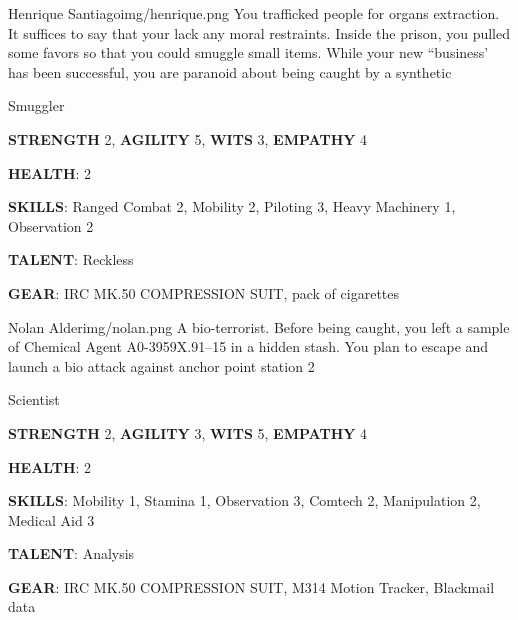 \newsect

\medskip \medskip \medskip \medskip \medskip  \medskip \medskip \medskip \medskip \medskip \medskip \medskip \medskip \medskip \medskip  \medskip \medskip \medskip \medskip \medskip 

\begin{rpg-pcbox}{Henrique Santiago}{img/henrique.png}
    You trafficked people for organs extraction. It suffices to say that your lack any moral restraints.
    Inside the prison, you pulled some favors so that you could smuggle small items. While your new ``business' has been successful, you are paranoid about being caught by a synthetic
\end{rpg-pcbox}

\begin{rpg-commentbox}{}
    Smuggler

    \textbf{STRENGTH} 2, \textbf{AGILITY} 5, \textbf{WITS} 3, \textbf{EMPATHY} 4

    \textbf{HEALTH}: 2

    \textbf{SKILLS}: Ranged Combat 2, Mobility 2, Piloting 3, Heavy Machinery 1, Observation 2
    
    \textbf{TALENT}: Reckless
    
    \textbf{GEAR}: IRC MK.50 COMPRESSION SUIT, pack of cigarettes
\end{rpg-commentbox}

\newsect

\begin{rpg-pcbox}{Nolan Alder}{img/nolan.png}
    A bio-terrorist. Before being caught, you left a sample of Chemical Agent A0-3959X.91–15 in a hidden stash. You plan to escape and launch a bio attack against anchor point station 2
\end{rpg-pcbox}

\begin{rpg-commentbox}{}
    Scientist

    \textbf{STRENGTH} 2, \textbf{AGILITY} 3, \textbf{WITS} 5, \textbf{EMPATHY} 4

    \textbf{HEALTH}: 2

    \textbf{SKILLS}: Mobility 1, Stamina 1, Observation 3, Comtech 2, Manipulation 2, Medical Aid 3
    
    \textbf{TALENT}: Analysis
    
    \textbf{GEAR}: IRC MK.50 COMPRESSION SUIT, M314 Motion Tracker, Blackmail data
\end{rpg-commentbox}

